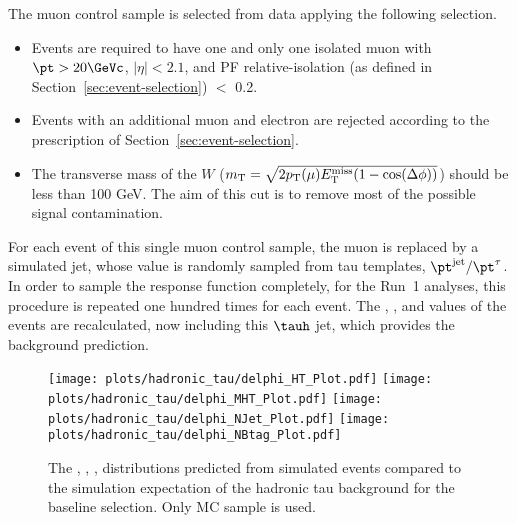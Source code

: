 % 
% 
The muon control sample is selected from data applying the following selection.
\begin{itemize}
\item Events are required to have one and only one isolated muon with $\pt>20\GeVc$, $|\eta|<2.1$, and
  PF relative-isolation (as defined in Section~\ref{sec:event-selection}) $<$ 0.2.
\item Events with an additional muon and electron %
  are rejected according to the prescription of Section~\ref{sec:event-selection}.
\item The transverse mass of the $W$ ($m_{\rm T} = \sqrt{2 p_{\rm T}(\mu) E^{\rm miss}_{\rm T} (1 - \cos(\Delta \phi))}$) 
  should be less than 100 GeV. The aim of this cut is to remove most of the possible signal contamination.
\end{itemize}
% 
% 
% 
For each event of this single muon control sample, the muon is replaced by a simulated \tauh jet,
whose \pt value is randomly sampled from tau templates, $\pt^{\text{jet}}/\pt^\tau$. 
In order to sample the response function completely, for the Run~1 analyses,
this procedure is repeated one hundred times for each event.
The \njets, \HT{}, and \text{\MHT} values of the events are recalculated, now including this $\tauh$ jet,
which provides the \tauh background prediction.

\begin{figure}[h!]
  \centering
  \texttt{[image: plots/hadronic\_tau/delphi\_HT\_Plot.pdf]}
  \texttt{[image: plots/hadronic\_tau/delphi\_MHT\_Plot.pdf]}
  \texttt{[image: plots/hadronic\_tau/delphi\_NJet\_Plot.pdf]}
  \texttt{[image: plots/hadronic\_tau/delphi\_NBtag\_Plot.pdf]}
  \caption{The \HT, \MHT, \njets, \nbjets distributions predicted from simulated events compared to the simulation
    expectation of the hadronic tau background for the baseline selection. Only \ttbar MC sample is used.}
  \label{fig:tauh_template_closure}
\end{figure}

